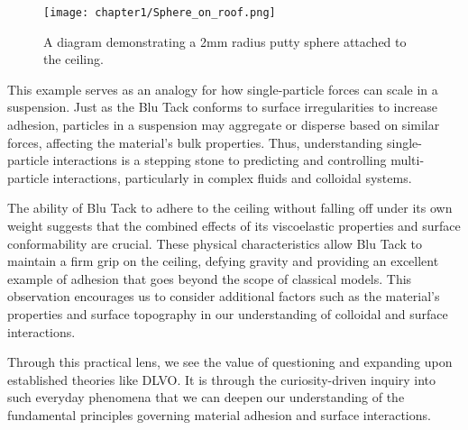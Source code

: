 \begin{figure}[h]     %
        \begin{center}
          \texttt{[image: chapter1/Sphere\_on\_roof.png]}
\end{center}
\caption{A diagram demonstrating a 2mm radius putty sphere attached to the ceiling.}
\label{fig:disp}                 %
\end{figure}

This example serves as an analogy for how single-particle forces can scale in a suspension. Just as the Blu Tack conforms to surface irregularities to increase adhesion, particles in a suspension may aggregate or disperse based on similar forces, affecting the material's bulk properties. Thus, understanding single-particle interactions is a stepping stone to predicting and controlling multi-particle interactions, particularly in complex fluids and colloidal systems.

The ability of Blu Tack to adhere to the ceiling without falling off under its own weight suggests that the combined effects of its viscoelastic properties and surface conformability are crucial. These physical characteristics allow Blu Tack to maintain a firm grip on the ceiling, defying gravity and providing an excellent example of adhesion that goes beyond the scope of classical models. This observation encourages us to consider additional factors such as the material's properties and surface topography in our understanding of colloidal and surface interactions.

Through this practical lens, we see the value of questioning and expanding upon established theories like DLVO. It is through the curiosity-driven inquiry into such everyday phenomena that we can deepen our understanding of the fundamental principles governing material adhesion and surface interactions.
